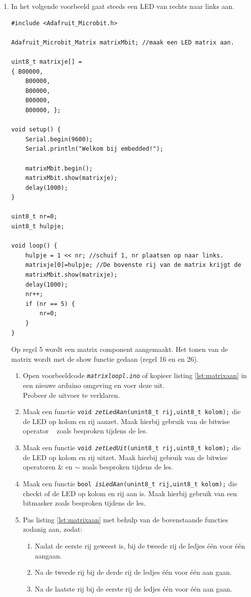 \begin{enumerate}
\item In het volgende voorbeeld gaat steeds een LED van rechts naar links aan.

\begin{lstlisting}[caption={Looplicht van de bovenste rij.},label={lst:matrixaan2}]
#include <Adafruit_Microbit.h>

Adafruit_Microbit_Matrix matrixMbit; //maak een LED matrix aan.

uint8_t matrixje[] =
{ B00000,
	B00000,
	B00000,
	B00000,
	B00000, };

void setup() {
	Serial.begin(9600);
	Serial.println("Welkom bij embedded!");

    matrixMbit.begin();
	matrixMbit.show(matrixje);
	delay(1000);  
}

uint8_t nr=0;
uint8_t hulpje;

void loop() {
	hulpje = 1 << nr; //schuif 1, nr plaatsen op naar links.
	matrixje[0]=hulpje; //De bovenste rij van de matrix krijgt de 
	matrixMbit.show(matrixje);
	delay(1000);
	nr++;
	if (nr == 5) {
	    nr=0;
	}        
}
\end{lstlisting}
Op regel 5 wordt een matrix component aangemaakt. Het tonen van de matrix wordt met de show functie gedaan (regel 16 en en 26).

\begin{enumerate}
	\item Open voorbeeldcode \texttt{\textit{matrixloopl.ino}} of kopieer listing \ref{lst:matrixaan} in een nieuwe arduino omgeving en voer deze uit.\\
	Probeer de uitvoer te verklaren.

\item Maak een functie \texttt{void \textit{zetLedAan}(unint8\_t rij,uint8\_t kolom);} die de LED op kolom en rij aanzet. Maak hierbij gebruik van de bitwise operator \textbar ~ zoals besproken tijdens de les.
\item Maak een functie \texttt{void \textit{zetLedUit}(unint8\_t rij,uint8\_t kolom);} die de LED op kolom en rij uitzet. Maak hierbij gebruik van de bitwise operatoren \& en $\sim$ zoals besproken tijdens de les.
\item Maak een functie \texttt{bool \textit{isLedAan}(unint8\_t rij,uint8\_t kolom);} die checkt of de LED op kolom en rij aan is. Maak hierbij gebruik van een bitmasker zoals besproken tijdens de les.

	\item Pas listing \ref{lst:matrixaan} met behulp van de bovenstaande functies zodanig aan, zodat:
\begin{enumerate}%
	\item Nadat de eerste rij geweest is, bij de tweede rij de ledjes \'{e}\'{e}n voor \'{e}\'{e}n  aangaan. 
	\item Na de tweede rij bij de derde rij de ledjes \'{e}\'{e}n voor \'{e}\'{e}n  aan gaan. 
	\item Na de laatste rij bij de eerste rij de ledjes \'{e}\'{e}n voor \'{e}\'{e}n  aan gaan. 
\end{enumerate}


\end{enumerate}
\end{enumerate}
